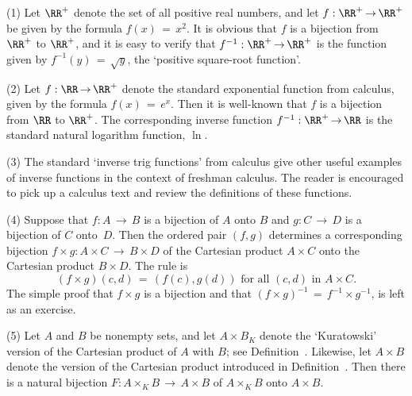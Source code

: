 {\hspace*{\parindent}
        (1) Let ${\RR}^{+}$ denote the set of all positive real numbers, and let $f:{\RR}^{+} \,{\rightarrow}\, {\RR}^{+}$ be given by the formula $f(x) \,=\, x^{2}$.
    It is obvious that $f$ is a bijection from ${\RR}^{+}$ to ${\RR}^{+}$, and it is easy to verify that $f^{-1}:{\RR}^{+} \,{\rightarrow}\, {\RR}^{+}$ is the function given by $f^{-1}(y) \,=\, \sqrt{y}$, the `positive square-root function'.

\V

        (2) Let $f:{\RR} \,{\rightarrow}\, {\RR}^{+}$ denote the standard exponential function from calculus, given by the formula $f(x) \,=\, e^{x}$.
    Then it is well-known that $f$ is a bijection from ${\RR}$ to ${\RR}^{+}$.
    The corresponding inverse function $f^{-1}:{\RR}^{+} \,{\rightarrow}\, {\RR}$ is the standard natural logarithm function, ${\ln}$.

\V

        (3) The standard `inverse trig functions' from calculus give other useful examples of inverse functions in the context of freshman calculus.
    The reader is encouraged to pick up a calculus text and review the definitions of these functions.

\V

        (4) Suppose that $f:A \,{\rightarrow}\, B$ is a bijection of $A$ onto $B$ and $g:C \,{\rightarrow}\, D$ is a bijection of $C$ onto~$D$.
    Then the ordered pair $(f,g)$ determines a corresponding bijection $f{\times}g:A{\times}C \,{\rightarrow}\, B{\times}D$ of the Cartesian product $A{\times}C$ onto the Cartesian product $B{\times}D$.
    The rule is
        \begin{displaymath}
        (f{\times}g)(c,d) \,=\, (f(c), g(d)) \mbox{ for all $(c,d)$ in $A{\times}C$}.
        \end{displaymath}
    The simple proof that $f{\times}g$ is a bijection and that $(f{\times}g)^{-1} \,=\, f^{-1}{\times}g^{-1}$, is left as an exercise.

\V

        (5) Let $A$ and $B$ be nonempty sets, and let $A{\times}B_{K}$ denote the `Kuratowski' version of the Cartesian product of $A$ with $B$;
    see Definition~.
    Likewise, let $A{\times}B$ denote the version of the Cartesian product introduced in Definition~.
    Then there is a natural bijection $F:A{\times}_{K}B \,{\rightarrow}\, A{\times}B$ of $A{\times}_{K}B$ onto $A{\times}B$.

}
